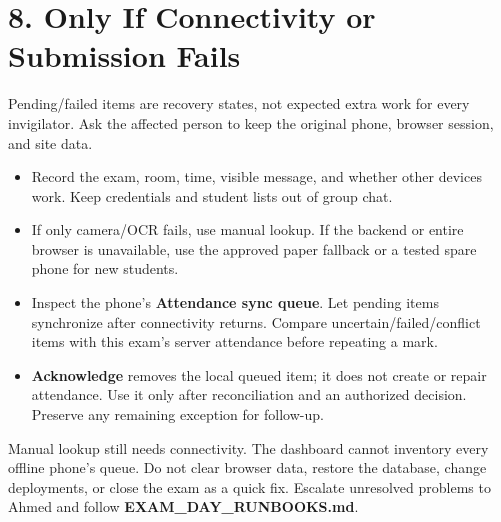 \documentclass[10pt,a4paper]{article}
\begin{document}
\section*{8. Only If Connectivity or Submission Fails}
Pending/failed items are recovery states, not expected extra work for every invigilator. Ask the affected person to keep the original phone, browser session, and site data.\par
\begin{itemize}\item[1.] Record the exam, room, time, visible message, and whether other devices work. Keep credentials and student lists out of group chat.\end{itemize}
\begin{itemize}\item[2.] If only camera/OCR fails, use manual lookup. If the backend or entire browser is unavailable, use the approved paper fallback or a tested spare phone for new students.\end{itemize}
\begin{itemize}\item[3.] Inspect the phone's \textbf{Attendance sync queue}. Let pending items synchronize after connectivity returns. Compare uncertain/failed/conflict items with this exam's server attendance before repeating a mark.\end{itemize}
\begin{itemize}\item[4.] \textbf{Acknowledge} removes the local queued item; it does not create or repair attendance. Use it only after reconciliation and an authorized decision. Preserve any remaining exception for follow-up.\end{itemize}
Manual lookup still needs connectivity. The dashboard cannot inventory every offline phone's queue. Do not clear browser data, restore the database, change deployments, or close the exam as a quick fix. Escalate unresolved problems to Ahmed and follow \textbf{EXAM\_DAY\_RUNBOOKS.md}.\par
\end{document}
